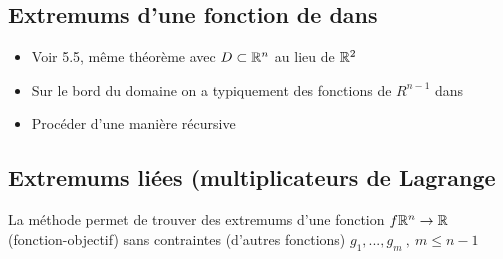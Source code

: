 \documentclass[12pt,a4paper]{article}
\begin{document}
\subsection{Extremums d'une fonction de \rn dans \R}
\begin{itemize}
	\item 	Voir 5.5, même théorème avec $D \subset \mathbb{R}^n$ au lieu de $\mathbb{R}^2$
	\item 	Sur le bord du domaine on a typiquement des fonctions de $R^{n-1}$ dans \R
	\item 	Procéder d'une manière récursive
\end{itemize}

\subsection{Extremums liées (multiplicateurs de Lagrange}
La méthode permet de trouver des extremums d'une fonction $f \mathbb{R}^n \to \mathbb{R}$ (fonction-objectif) sans contraintes (d'autres fonctions) $g_1,...,g_m \ , \ m \leq n-1$
\end{document}
